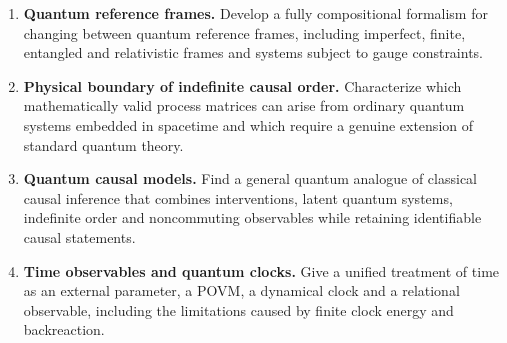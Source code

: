 \documentclass{article}
\begin{document}
\begin{enumerate}[label=\textbf{F\arabic*.},leftmargin=*]
\item \formalism{} \textbf{Quantum reference frames.}
Develop a fully compositional formalism for changing between quantum
reference frames, including imperfect, finite, entangled and
relativistic frames and systems subject to gauge constraints.

\item \formalism{} \textbf{Physical boundary of indefinite causal order.}
Characterize which mathematically valid process matrices can arise
from ordinary quantum systems embedded in spacetime and which require
a genuine extension of standard quantum theory.

\item \formalism{} \textbf{Quantum causal models.}
Find a general quantum analogue of classical causal inference that
combines interventions, latent quantum systems, indefinite order and
noncommuting observables while retaining identifiable causal
statements.

\item \formalism{} \textbf{Time observables and quantum clocks.}
Give a unified treatment of time as an external parameter, a POVM, a
dynamical clock and a relational observable, including the limitations
caused by finite clock energy and backreaction.

\end{enumerate}
\end{document}
